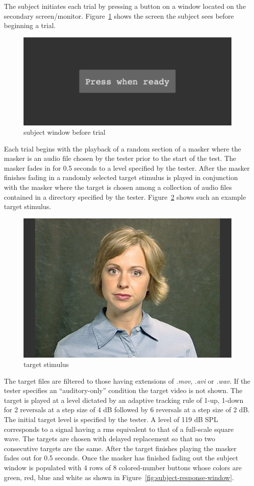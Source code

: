 \documentclass[11pt,pdftex,letterpaper]{article}
\begin{document}
The subject initiates each trial by pressing a button on a window located on the secondary screen/monitor. Figure~\ref{fig:subject-ready-window} shows the screen the subject sees before beginning a trial.
\begin{figure}
\centering
\includegraphics[width = 0.9\linewidth]{subject-ready-window.png}
\caption{subject window before trial}
\label{fig:subject-ready-window}
\end{figure}
Each trial begins with the playback of a random section of a masker where the masker is an audio file chosen by the tester prior to the start of the test. The masker fades in for 0.5 seconds to a level specified by the tester. After the masker finishes fading in a randomly selected target stimulus is played in conjunction with the masker where the target is chosen among a collection of audio files contained in a directory specified by the tester. Figure~\ref{fig:target-stimulus} shows such an example target stimulus.
\begin{figure}
\centering
\includegraphics[width = 0.9\linewidth]{target-stimulus.png}
\caption{target stimulus}
\label{fig:target-stimulus}
\end{figure}
The target files are filtered to those having extensions of \textit{.mov}, \textit{.avi} or \textit{.wav}. If the tester specifies an “auditory-only” condition the target video is not shown. The target is played at a level dictated by an adaptive tracking rule of 1-up, 1-down for 2 reversals at a step size of 4 dB followed by 6 reversals at a step size of 2 dB. The initial target level is specified by the tester. A level of 119 dB SPL corresponds to a signal having a rms equivalent to that of a full-scale square wave. The targets are chosen with delayed replacement so that no two consecutive targets are the same. After the target finishes playing the masker fades out for 0.5 seconds. Once the masker has finished fading out the subject window is populated with 4 rows of 8 colored-number buttons whose colors are green, red, blue and white as shown in Figure~\ref{fig:subject-response-window}. 
\end{document}
